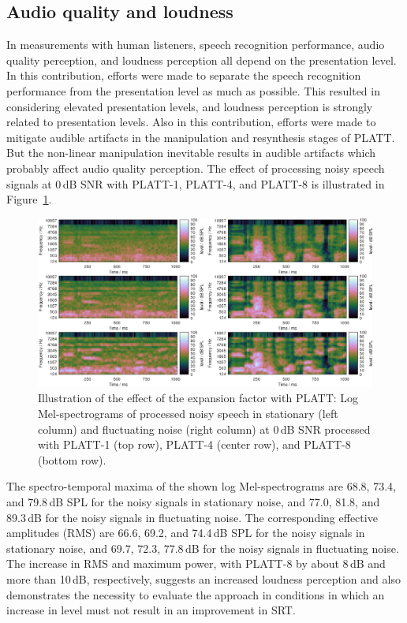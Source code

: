 \documentclass[10pt,a4paper,twocolumn]{article}
\begin{document}
\subsection*{Audio quality and loudness}
%
In measurements with human listeners, speech recognition performance, audio quality perception, and loudness perception all depend on the presentation level.
%
In this contribution, efforts were made to separate the speech recognition performance from the presentation level as much as possible.
%
This resulted in considering elevated presentation levels, and loudness perception is strongly related to presentation levels.
%
Also in this contribution, efforts were made to mitigate audible artifacts in the manipulation and resynthesis stages of PLATT.
%
But the non-linear manipulation inevitable results in audible artifacts which probably affect audio quality perception.
%
The effect of processing noisy speech signals at 0\,dB SNR with PLATT-1, PLATT-4, and PLATT-8 is illustrated in Figure~\ref{fig:21}.
%
\begin{figure}[h!]
	\centerline{\includegraphics[width=1.0\textwidth]{images/signal-platt-processed}}
	\caption{Illustration of the effect of the expansion factor with PLATT: Log Mel-spectrograms of processed noisy speech in stationary (left column) and fluctuating noise (right column) at 0\,dB SNR processed with PLATT-1 (top row), PLATT-4 (center row), and PLATT-8 (bottom row).}
	\label{fig:21}
\end{figure}
%
The spectro-temporal maxima of the shown log Mel-spectrograms are 68.8, 73.4, and 79.8\,dB SPL for the noisy signals in stationary noise, and 77.0, 81.8, and 89.3\,dB for the noisy signals in fluctuating noise.
%
The corresponding effective amplitudes (RMS) are 66.6, 69.2, and 74.4\,dB SPL for the noisy signals in stationary noise, and 69.7, 72.3, 77.8\,dB for the noisy signals in fluctuating noise.
%
The increase in RMS and maximum power, with PLATT-8 by about 8\,dB and more than 10\,dB, respectively, suggests an increased loudness perception and also demonstrates the necessity to evaluate the approach in conditions in which an increase in level must not result in an improvement in SRT.
\end{document}
